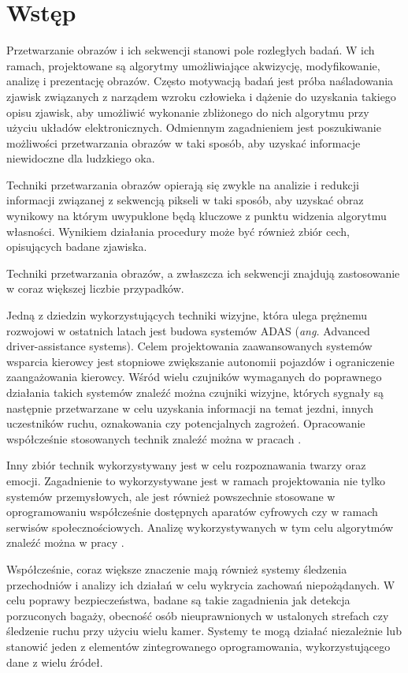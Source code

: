 \chapter{Wstęp}

Przetwarzanie obrazów i ich sekwencji stanowi pole rozległych badań. W ich ramach, projektowane są algorytmy umożliwiające akwizycję, modyfikowanie, analizę i prezentację obrazów. Często motywacją badań jest próba naśladowania zjawisk związanych z narządem wzroku człowieka i dążenie do uzyskania takiego opisu zjawisk, aby umożliwić wykonanie zbliżonego do nich algorytmu przy użyciu układów elektronicznych. Odmiennym zagadnieniem jest poszukiwanie możliwości przetwarzania obrazów w taki sposób, aby uzyskać informacje niewidoczne dla ludzkiego oka.

Techniki przetwarzania obrazów opierają się zwykle na analizie i redukcji informacji związanej z sekwencją pikseli w taki sposób, aby uzyskać obraz wynikowy na którym uwypuklone będą kluczowe z punktu widzenia algorytmu własności. Wynikiem działania procedury może być również zbiór cech, opisujących badane zjawiska.

Techniki przetwarzania obrazów, a zwłaszcza ich sekwencji znajdują zastosowanie w coraz większej liczbie przypadków.

Jedną z dziedzin wykorzystujących techniki wizyjne, która ulega prężnemu rozwojowi w ostatnich latach jest budowa systemów ADAS (\emph{ang.} Advanced driver-assistance systems). Celem projektowania zaawansowanych systemów wsparcia kierowcy jest stopniowe zwiększanie autonomii pojazdów i ograniczenie zaangażowania kierowcy. Wśród wielu czujników wymaganych do poprawnego działania takich systemów znaleźć można czujniki wizyjne, których sygnały są następnie przetwarzane w celu uzyskania informacji na temat jezdni, innych uczestników ruchu, oznakowania czy potencjalnych zagrożeń. Opracowanie współcześnie stosowanych technik znaleźć można w pracach \cite{Bengler2014,Velez2017}.

Inny zbiór technik wykorzystywany jest w celu rozpoznawania twarzy oraz emocji. Zagadnienie to wykorzystywane jest w ramach projektowania nie tylko systemów przemysłowych, ale jest również powszechnie stosowane w oprogramowaniu współcześnie dostępnych aparatów cyfrowych czy w ramach serwisów społecznościowych. Analizę wykorzystywanych w tym celu algorytmów znaleźć można w pracy \cite{Anil2016}.

Współcześnie, coraz większe znaczenie mają również systemy śledzenia przechodniów i analizy ich działań w celu wykrycia zachowań niepożądanych. W celu poprawy bezpieczeństwa, badane są takie zagadnienia jak detekcja porzuconych bagaży, obecność osób nieuprawnionych w ustalonych strefach czy śledzenie ruchu przy użyciu wielu kamer. Systemy te mogą działać niezależnie lub stanowić jeden z elementów zintegrowanego oprogramowania, wykorzystującego dane z wielu źródeł. \cite{Sriram2016,Hussain2016,Gouo2015}

